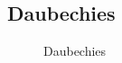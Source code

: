 \pagebreak
\subsection{Daubechies}

\begin{figure}[!htb]\centering
    \begin{minipage}{0.8\textwidth}
        \caption{\small{Daubechies}}
    \end{minipage}
\end{figure}

